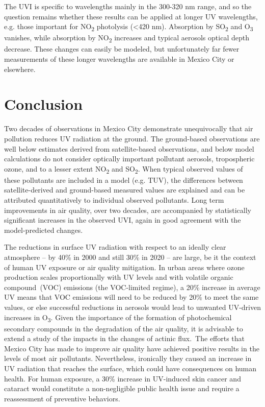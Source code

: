 \documentclass[10pt]{article}
\begin{document}
The UVI is specific to wavelengths mainly in the 300-320 nm range, and
so the question remains whether these results can be applied at longer
UV wavelengths, e.g. those important for NO\textsubscript{2} photolysis
(\textless{}420 nm). Absorption by SO\textsubscript{2} and
O\textsubscript{3} vanishes, while absorption by NO\textsubscript{2}
increases and typical aerosols optical depth decrease. These changes can
easily be modeled, but unfortunately far fewer measurements of these
longer wavelengths are available in Mexico City or elsewhere.

\section*{Conclusion}\label{conclusion}

Two decades of observations in Mexico City demonstrate unequivocally
that air pollution reduces UV radiation at the ground. The ground-based
observations are well below estimates derived from satellite-based
observations, and below model calculations do not consider optically
important pollutant aerosols, tropospheric ozone, and to a lesser extent
NO\textsubscript{2} and SO\textsubscript{2}. When typical observed
values of these pollutants are included in a model (e.g. TUV), the
differences between satellite-derived and ground-based measured values
are explained and can be attributed quantitatively to individual
observed pollutants. Long term improvements in air quality, over two
decades, are accompanied by statistically significant increases in the
observed UVI, again in good agreement with the model-predicted changes.
~

The reductions in surface UV radiation with respect to an ideally clear
atmosphere -- by 40\% in 2000 and still 30\% in 2020 -- are large, be it
the context of human UV exposure or air quality mitigation. In urban
areas where ozone production scales proportionally with UV levels and
with volatile organic compound~(VOC) emissions (the VOC-limited regime),
a 20\% increase in average UV means that VOC emissions will need to be
reduced by 20\% to meet the same values, or else successful reductions
in aerosols would lead to unwanted UV-driven increases in
O\textsubscript{3}. Given the importance of the formation of
photochemical secondary compounds in the degradation of the air quality,
it is advisable to extend a study of the impacts in the changes of
actinic flux.~The efforts that Mexico City has made to improve air
quality have achieved positive results in the levels of most air
pollutants. Nevertheless, ironically they caused an increase in UV
radiation that reaches the surface, which could have consequences on
human health. For human exposure, a 30\% increase in UV-induced skin
cancer and cataract would constitute a non-negligible public health
issue and require a reassessment of preventive behaviors. ~
\end{document}
